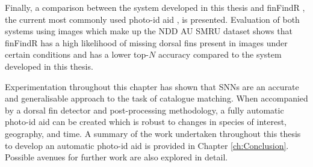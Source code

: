 Finally, a comparison between the system developed in this thesis and finFindR \cite{thompson_finfindr_2022}, the current most commonly used photo-id aid \cite{tyson_moore_rise_2022}, is presented. Evaluation of both systems using images which make up the NDD AU SMRU dataset shows that finFindR has a high likelihood of missing dorsal fins present in images under certain conditions and has a lower top-$N$ accuracy compared to the system developed in this thesis.

Experimentation throughout this chapter has shown that SNNs are an accurate and generalisable approach to the task of catalogue matching. When accompanied by a dorsal fin detector and post-processing methodology, a fully automatic photo-id aid can be created which is robust to changes in species of interest, geography, and time. A summary of the work undertaken throughout this thesis to develop an automatic photo-id aid is provided in Chapter \ref{ch:Conclusion}. Possible avenues for further work are also explored in detail.
